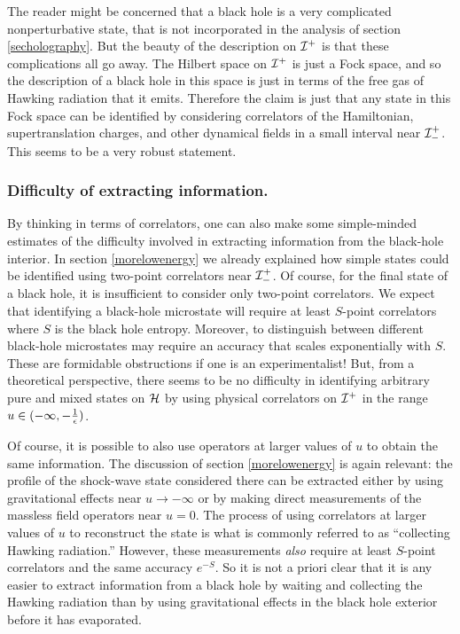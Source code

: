 \documentclass[12pt]{article}
\def \scrip{{\cal I}^{+}}
\def \scrippast{{\cal I}^{+}_{-}}
\begin{document}
The reader might be concerned that a black hole is a very complicated nonperturbative state, that is not incorporated in the analysis of section \ref{secholography}.  But the beauty of  the description on $\scrip$ is that these complications all go away. The Hilbert space on $\scrip$ is just a Fock space, and so the description of a black hole in this space is just in terms of the free gas of Hawking radiation that it emits.  Therefore the claim
is just that any state in this Fock space can be identified by considering correlators of the Hamiltonian, supertranslation charges, and other dynamical fields in a small interval near $\scrippast$.   This seems to be a very robust statement.

\subsubsection*{Difficulty of extracting information.}
By thinking in terms of correlators, one can also make some simple-minded estimates of the difficulty involved in extracting information from the black-hole interior.  In  section \ref{morelowenergy} we already explained how simple states could be identified using two-point correlators near $\scrippast$.  Of course, for the final state of a black hole, it is insufficient to consider only two-point correlators. We expect that identifying a black-hole microstate will require at least $S$-point correlators where $S$ is the black hole entropy. Moreover, to distinguish between different black-hole microstates may require an accuracy that scales exponentially with $S$. These are formidable obstructions if one is an experimentalist! But, from a theoretical perspective, there seems to be no difficulty in identifying arbitrary pure and mixed states on ${\cal H}$ by using physical correlators on $\scrip$ in the range $u \in (-\infty, -{1 \over \epsilon})$.

Of course, it is possible to also use operators at larger values of $u$ to obtain the same information. The discussion of section \ref{morelowenergy} is again relevant: the profile of the shock-wave state considered there can be extracted either by using gravitational effects near $u \rightarrow -\infty$ or by making direct measurements of the massless field operators near $u = 0$. The process of using correlators at larger values of $u$ to reconstruct the state is what is commonly referred to as ``collecting Hawking radiation.'' However, these measurements {\em also} require at least $S$-point correlators and the same accuracy $e^{-S}$. So it is not a priori clear that it is any easier to extract information from a black hole by waiting and collecting the Hawking radiation than by using gravitational effects in the black hole exterior before it has evaporated.
\end{document}

